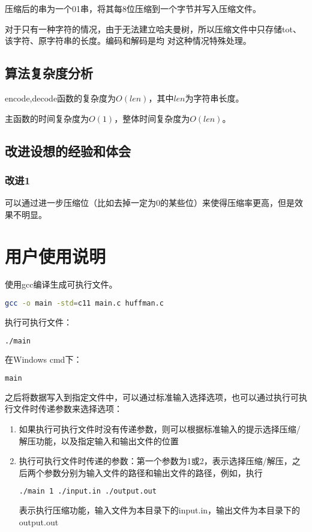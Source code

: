 \documentclass{article}
\begin{document}
压缩后的串为一个01串，将其每8位压缩到一个字节并写入压缩文件。

对于只有一种字符的情况，由于无法建立哈夫曼树，所以压缩文件中只存储tot、该字符、原字符串的长度。编码和解码是均
对这种情况特殊处理。

\subsection{算法复杂度分析}

encode,decode函数的复杂度为$O(len)$，其中$len$为字符串长度。

主函数的时间复杂度为$O(1)$，整体时间复杂度为$O(len)$。

\subsection{改进设想的经验和体会}

\subsubsection{改进1}

可以通过进一步压缩位（比如去掉一定为0的某些位）来使得压缩率更高，但是效果不明显。

\section{用户使用说明}

使用gcc编译生成可执行文件。

\begin{lstlisting}[language={bash},
    basicstyle=\small\consolas]
gcc -o main -std=c11 main.c huffman.c
\end{lstlisting}

执行可执行文件：

\begin{lstlisting}[language={bash},
    basicstyle=\small\consolas]
./main
\end{lstlisting}

在Windows cmd下：

\begin{lstlisting}[language={bash},
    basicstyle=\small\consolas]
main
\end{lstlisting}

之后将数据写入到指定文件中，可以通过标准输入选择选项，也可以通过执行可执行文件时传递参数来选择选项：

\begin{enumerate}
    \item 如果执行可执行文件时没有传递参数，则可以根据标准输入的提示选择压缩/解压功能，以及指定输入和输出文件的位置
    \item 执行可执行文件时传递的参数：第一个参数为1或2，表示选择压缩/解压，之后两个参数分别为输入文件的路径和输出文件的路径，例如，执行
\begin{lstlisting}[language={bash},
    basicstyle=\small\consolas]
./main 1 ./input.in ./output.out
\end{lstlisting}
    表示执行压缩功能，输入文件为本目录下的input.in，输出文件为本目录下的output.out
\end{enumerate}
\end{document}
